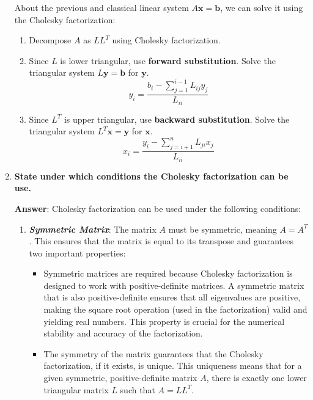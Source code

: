 \begin{enumerate}[label=\textcolor{Green3}{\textbf{\arabic*.}}]
    About the previous and classical linear system $A\mathbf{x} = \mathbf{b}$, we can solve it using the Cholesky factorization:
    \begin{enumerate}
        \item Decompose $A$ as $LL^{T}$ using Cholesky factorization.
        \item Since $L$ is lower triangular, use \textbf{forward substitution}. Solve the triangular system $L\mathbf{y} = \mathbf{b}$ for $\mathbf{y}$.
        \begin{equation*}
            y_{i} = \dfrac{b_{i} - \displaystyle\sum_{j=1}^{i-1} L_{ij} y_{j}}{L_{ii}}
        \end{equation*}
        \item Since $L^{T}$ is upper triangular, use \textbf{backward substitution}. Solve the triangular system $L^{T}\mathbf{x} = \mathbf{y}$ for $\mathbf{x}$.
        \begin{equation*}
            x_{i} = \dfrac{y_{i} - \displaystyle\sum_{j=i+1}^{n} L_{ji} x_{j}}{L_{ii}}
        \end{equation*}
    \end{enumerate}


    \newpage

    \item \textcolor{Green3}{\textbf{%
        State under which conditions the Cholesky factorization can be use.%
    }}

    \textbf{Answer}: Cholesky factorization can be used under the following conditions:
    \begin{enumerate}
        \item \textbf{\emph{Symmetric Matrix}}: The matrix $A$ must be symmetric, meaning $A = A^{T}$. This ensures that the matrix is equal to its transpose and guarantees two important properties:
        \begin{itemize}
            \item Symmetric matrices are required because Cholesky factorization is designed to work with positive-definite matrices. A symmetric matrix that is also positive-definite ensures that all eigenvalues are positive, making the square root operation (used in the factorization) valid and yielding real numbers. This property is crucial for the numerical stability and accuracy of the factorization.
            \item The symmetry of the matrix guarantees that the Cholesky factorization, if it exists, is unique. This uniqueness means that for a given symmetric, positive-definite matrix $A$, there is exactly one lower triangular matrix $L$ such that $A = LL^{T}$.
        \end{itemize}


\end{enumerate}
\end{enumerate}
